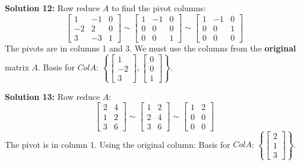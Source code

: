 \documentclass[11pt]{article}
\begin{document}
\vspace{0.3cm}
\textbf{Solution 12:} Row reduce $A$ to find the pivot columns:
$$ \begin{bmatrix} 1 & -1 & 0 \\ -2 & 2 & 0 \\ 3 & -3 & 1 \end{bmatrix} \sim \begin{bmatrix} 1 & -1 & 0 \\ 0 & 0 & 0 \\ 0 & 0 & 1 \end{bmatrix} \sim \begin{bmatrix} 1 & -1 & 0 \\ 0 & 0 & 1 \\ 0 & 0 & 0 \end{bmatrix} $$
The pivots are in columns 1 and 3. We must use the columns from the \textbf{original} matrix $A$.
Basis for $Col A$: $\left\{ \begin{bmatrix} 1 \\ -2 \\ 3 \end{bmatrix}, \begin{bmatrix} 0 \\ 0 \\ 1 \end{bmatrix} \right\}$.

\vspace{0.3cm}
\textbf{Solution 13:} Row reduce $A$:
$$ \begin{bmatrix} 2 & 4 \\ 1 & 2 \\ 3 & 6 \end{bmatrix} \sim \begin{bmatrix} 1 & 2 \\ 2 & 4 \\ 3 & 6 \end{bmatrix} \sim \begin{bmatrix} 1 & 2 \\ 0 & 0 \\ 0 & 0 \end{bmatrix} $$
The pivot is in column 1. Using the original column:
Basis for $Col A$: $\left\{ \begin{bmatrix} 2 \\ 1 \\ 3 \end{bmatrix} \right\}$.
\end{document}
